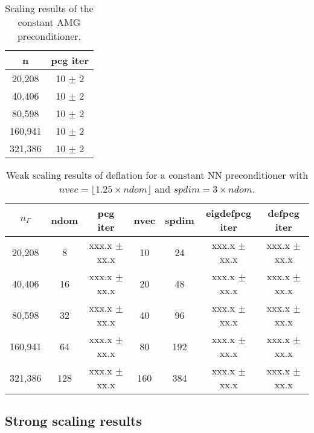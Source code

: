 \documentclass{article}
\begin{document}
\begin{table}[ht]
	\caption{Scaling results of the constant AMG preconditioner.}
	\centering
	\begin{tabular}{|c|c|}
		\hline
		n & pcg iter \\
		\hline
		20,208  &  10 $\pm$ 2 \\
		40,406  & 10 $\pm$ 2  \\
		80,598  & 10 $\pm$ 2  \\
		160,941 & 10 $\pm$ 2  \\
		321,386 & 10 $\pm$ 2  \\
		\hline
	\end{tabular}
	\label{Tab:020}
\end{table}


\begin{table}[ht]
	\caption{Weak scaling results of deflation for a constant NN preconditioner with $nvec=\lfloor1.25\times ndom\rfloor$ and $spdim=3\times ndom$.}
	\centering
	\begin{tabular}{|c|c|c|c|c|c|c|}
	\hline
	$n_\Gamma$ & ndom & \makecell{pcg\\ iter} & nvec & spdim & \makecell{eigdefpcg\\ iter} & \makecell{defpcg\\ iter}\\
	\hline
	20,208  &   8 & xxx.x $\pm$  xx.x &  10 &  24 & xxx.x $\pm$ xx.x & xxx.x $\pm$ xx.x \\
	40,406  &  16 & xxx.x $\pm$  xx.x &  20 &  48 & xxx.x $\pm$ xx.x & xxx.x $\pm$ xx.x \\
	80,598  &  32 & xxx.x $\pm$  xx.x &  40 &  96 & xxx.x $\pm$ xx.x & xxx.x $\pm$ xx.x \\
	160,941 &  64 & xxx.x $\pm$  xx.x &  80 & 192 & xxx.x $\pm$ xx.x & xxx.x $\pm$ xx.x \\
	321,386 & 128 & xxx.x $\pm$  xx.x & 160 & 384 & xxx.x $\pm$ xx.x & xxx.x $\pm$ xx.x \\
	\hline
    \end{tabular}
	\label{Tab:025}
\end{table}

\subsection{Strong scaling results}
\end{document}
